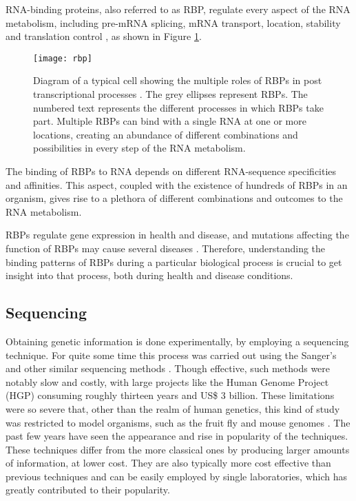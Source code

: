 RNA-binding proteins, also referred to as RBP, regulate every aspect of the RNA
metabolism, including pre-mRNA splicing, mRNA transport, location, stability and
translation control \cite{Cooper2009777, Muller-McNicoll2013, Sonenberg2007721,
Sonenberg2009731}, as shown in Figure \ref{fig:rbp}.

\begin{figure}[!htb]
  \begin{center}
    \leavevmode
    \texttt{[image: rbp]}
    \caption[Role of RBPs in the RNA metabolism process]{
      Diagram of a typical cell showing the multiple roles of RBPs in post
      transcriptional processes \cite{janga2011construction}. The grey ellipses
      represent RBPs. The numbered text represents the different processes in
      which RBPs take part. Multiple RBPs can bind with a single RNA at one or
      more locations, creating an abundance of different combinations and
      possibilities in every step of the RNA metabolism.
    }
    \label{fig:rbp}
  \end{center}
\end{figure}

The binding of RBPs to RNA depends on different RNA-sequence specificities and
affinities. This aspect, coupled with the existence of hundreds of RBPs in an
organism, gives rise to a plethora of different combinations and outcomes to the
RNA metabolism.

RBPs regulate gene expression in health and disease, and mutations affecting the
function of RBPs may cause several diseases \cite{Cooper2009777}. Therefore,
understanding the binding patterns of RBPs during a particular biological
process is crucial to get insight into that process, both during health and
disease conditions.

\subsection{Sequencing}

Obtaining genetic information is done experimentally, by employing a sequencing
technique. For quite some time this process was carried out using the Sanger's
and other similar sequencing methods \cite{Reis-Filho2009}. Though
effective, such methods were notably slow and costly, with large projects like
the Human Genome Project (HGP) consuming roughly thirteen years and US\$ 3
billion. These limitations were so severe that, other than the realm of human
genetics, this kind of study was restricted to model organisms, such as the
fruit fly and mouse genomes \cite{Wolf2013}. The past few years have seen the
appearance and rise in popularity of the \ngs{} techniques. These techniques
differ from the more classical ones by producing larger amounts of information,
at lower cost. They are also typically more cost effective than previous
techniques and can be easily employed by single laboratories, which has greatly
contributed to their popularity.

